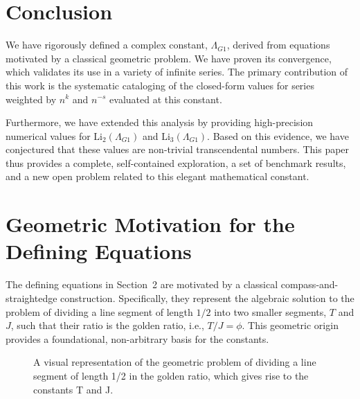 \documentclass{amsart}
\theoremstyle{plain}
\theoremstyle{definition}
\theoremstyle{remark}
\newcommand{\LambdaG}{\Lambda_{G1}}
\begin{document}
\section{Conclusion}
We have rigorously defined a complex constant, $\LambdaG$, derived from equations motivated by a classical geometric problem. We have proven its convergence, which validates its use in a variety of infinite series. The primary contribution of this work is the systematic cataloging of the closed-form values for series weighted by $n^k$ and $n^{-s}$ evaluated at this constant.

Furthermore, we have extended this analysis by providing high-precision numerical values for $\mathrm{Li}_2(\LambdaG)$ and $\mathrm{Li}_3(\LambdaG)$. Based on this evidence, we have conjectured that these values are non-trivial transcendental numbers. This paper thus provides a complete, self-contained exploration, a set of benchmark results, and a new open problem related to this elegant mathematical constant.

\appendix
\section{Geometric Motivation for the Defining Equations}
\label{app:A}
The defining equations in Section~2 are motivated by a classical compass-and-straightedge construction. Specifically, they represent the algebraic solution to the problem of dividing a line segment of length $1/2$ into two smaller segments, $T$ and $J$, such that their ratio is the golden ratio, i.e., $T/J = \phi$. This geometric origin provides a foundational, non-arbitrary basis for the constants.

\begin{figure}[htbp]
    \centering
    \caption{A visual representation of the geometric problem of dividing a line segment of length 1/2 in the golden ratio, which gives rise to the constants T and J.}
    \label{fig:geometry}
\end{figure}
\end{document}
